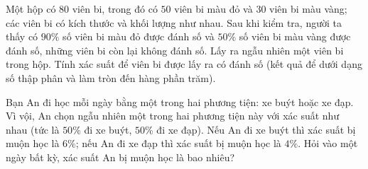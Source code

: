\begin{bt}%
	Một hộp có $80$ viên bi, trong đó có $50$ viên bi màu đỏ và $30$  viên bi màu vàng; các viên bi có kích thước và khối lượng như nhau. Sau khi kiểm tra, người ta thấy có $90\%$ số viên bi màu đỏ được đánh số và $50\%$ số viên bi màu vàng được đánh số, những viên bi còn lại không đánh số. Lấy ra ngẫu nhiên một viên bi trong hộp. Tính xác suất để viên bi được lấy ra có đánh số (kết quả để dưới dạng số thập phân và làm tròn đến hàng phần trăm).
\end{bt}

\begin{bt}%
	Bạn An đi học mỗi ngày bằng một trong hai phương tiện: xe buýt hoặc  xe đạp. Vì vội, An chọn ngẫu nhiên một trong hai phương tiện này với xác suất như nhau (tức là $50\%$ đi xe buýt, $50\%$ đi xe đạp). Nếu An đi xe buýt thì xác suất bị muộn học là $6\%$; nếu An đi xe đạp thì xác suất bị muộn học là $4\%$. Hỏi vào một ngày bất kỳ, xác suất An bị muộn học là bao nhiêu?
\end{bt}

